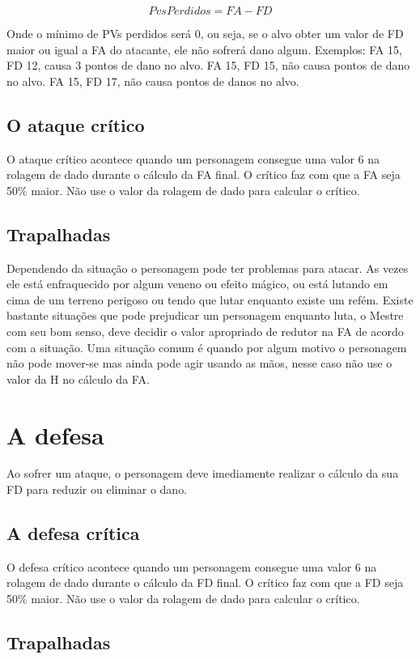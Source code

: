 \[ PvsPerdidos= FA - FD \]

Onde o mínimo de PVs perdidos será 0, ou seja, se o alvo obter um valor de FD maior ou igual a FA do atacante, ele não sofrerá dano algum. Exemplos: FA 15, FD 12, causa 3 pontos de dano no alvo. FA 15, FD 15, não causa pontos de dano no alvo. FA 15, FD 17, não causa pontos de danos no alvo.

\subsection{O ataque crítico}

O ataque crítico acontece quando um personagem consegue uma valor 6 na rolagem de dado durante o cálculo da FA final. O crítico faz com que a FA seja 50\% maior. Não use o valor da rolagem de dado para calcular o crítico.

\subsection{Trapalhadas}

Dependendo da situação o personagem pode ter problemas para atacar. As vezes ele está enfraquecido por algum veneno ou efeito mágico, ou está lutando em cima de um terreno perigoso ou tendo que lutar enquanto existe um refém. Existe bastante situações que pode prejudicar um personagem enquanto luta, o Mestre com seu bom senso, deve decidir o valor apropriado de redutor na FA de acordo com a situação. Uma situação comum é quando por algum motivo o personagem não pode mover-se mas ainda pode agir usando as mãos, nesse caso não use o valor da H no cálculo da FA.

\section{A defesa}

Ao sofrer um ataque, o personagem deve imediamente realizar o cálculo da sua FD para reduzir ou eliminar o dano.

\subsection{A defesa crítica}

O defesa crítico acontece quando um personagem consegue uma valor 6 na rolagem de dado durante o cálculo da FD final. O crítico faz com que a FD seja 50\% maior. Não use o valor da rolagem de dado para calcular o crítico.

\subsection{Trapalhadas}

